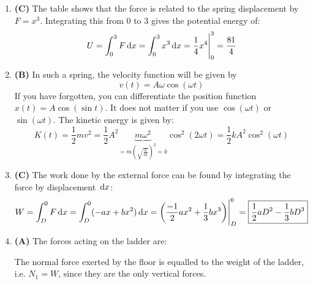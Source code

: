 \documentclass{../oss-handout}
\begin{document}
\begin{enumerate}[leftmargin=17pt]
\item\textbf{(C)} The table shows that the force is related to the spring
  displacement by $F=x^3$. Integrating this from 0 to 3 gives the potential
  energy of:
  \begin{displaymath}
    U=\int_0^3 F\dl x=\int_0^3 x^3\dl x = \frac14x^4\Biggr|^3_0 = \frac{81}4
  \end{displaymath}

\item\textbf{(B)} In such a spring, the velocity function will be given by
  \begin{displaymath}
    v(t)= A\omega\cos(\omega t)
  \end{displaymath}
  If you have forgotten, you can differentiate the position function
  $x(t)=A\cos(\sin t)$. It does not matter if you use $\cos(\omega t)$ or
  $\sin(\omega t)$. The kinetic energy is given by:
  \begin{displaymath}
    K(t)=\frac12mv^2=\frac12{A^2}
    \underbrace{m\omega^2}_{=m\left(\sqrt{\frac km}\right)^2=k}
    \cos^2(2\omega t)=\boxed{\frac12kA^2\cos^2(\omega t)}
  \end{displaymath}

\item\textbf{(C)} The work done by the external force can be found by
  integrating the force by displacement $\dl x$:
  \begin{displaymath}
    W= \int_D^0 F\dl x = \int_D^0 (-ax+bx^2)\dl x
    =\left(\frac{-1}2ax^2+\frac13bx^3\right)\Biggr|^0_D
    =\boxed{\frac12aD^2-\frac13bD^3}
  \end{displaymath}
  \newpage
  
\item\textbf{(A)} The forces acting on the ladder are:
  \begin{center}
  \end{center}
  The normal force exerted by the floor is equalled to the weight of the ladder,
  i.e. $N_1=W$, since they are the only vertical forces.
  

\end{enumerate}
\end{document}
